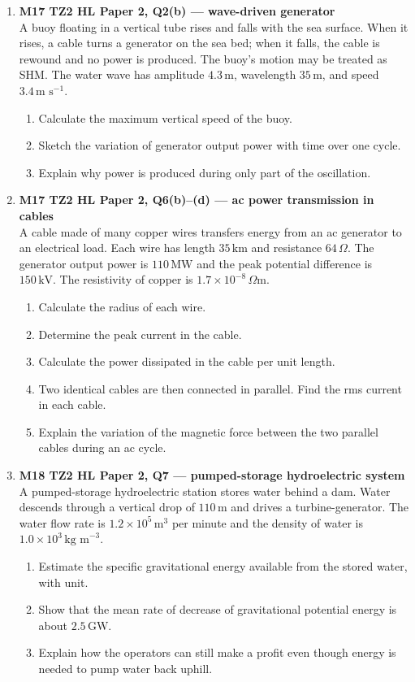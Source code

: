 \documentclass[11pt]{article}
\begin{document}
\begin{enumerate}[leftmargin=*, itemsep=1.2em]

\item \textbf{M17 TZ2 HL Paper 2, Q2(b) --- wave-driven generator}\\
A buoy floating in a vertical tube rises and falls with the sea surface. When it rises, a cable turns a generator on the sea bed; when it falls, the cable is rewound and no power is produced. The buoy's motion may be treated as SHM. The water wave has amplitude $4.3\,\text{m}$, wavelength $35\,\text{m}$, and speed $3.4\,\text{m s}^{-1}$.
\begin{enumerate}[label=(\alph*)]
\item Calculate the maximum vertical speed of the buoy.
\item Sketch the variation of generator output power with time over one cycle.
\item Explain why power is produced during only part of the oscillation.
\end{enumerate}

\item \textbf{M17 TZ2 HL Paper 2, Q6(b)--(d) --- ac power transmission in cables}\\
A cable made of many copper wires transfers energy from an ac generator to an electrical load. Each wire has length $35\,\text{km}$ and resistance $64\,\Omega$. The generator output power is $110\,\text{MW}$ and the peak potential difference is $150\,\text{kV}$. The resistivity of copper is $1.7\times 10^{-8}\,\Omega\text{m}$.
\begin{enumerate}[label=(\alph*)]
\item Calculate the radius of each wire.
\item Determine the peak current in the cable.
\item Calculate the power dissipated in the cable per unit length.
\item Two identical cables are then connected in parallel. Find the rms current in each cable.
\item Explain the variation of the magnetic force between the two parallel cables during an ac cycle.
\end{enumerate}

\item \textbf{M18 TZ2 HL Paper 2, Q7 --- pumped-storage hydroelectric system}\\
A pumped-storage hydroelectric station stores water behind a dam. Water descends through a vertical drop of $110\,\text{m}$ and drives a turbine-generator. The water flow rate is $1.2\times10^5\,\text{m}^3$ per minute and the density of water is $1.0\times10^3\,\text{kg m}^{-3}$.
\begin{enumerate}[label=(\alph*)]
\item Estimate the specific gravitational energy available from the stored water, with unit.
\item Show that the mean rate of decrease of gravitational potential energy is about $2.5\,\text{GW}$.
\item Explain how the operators can still make a profit even though energy is needed to pump water back uphill.
\end{enumerate}


\end{enumerate}
\end{document}
